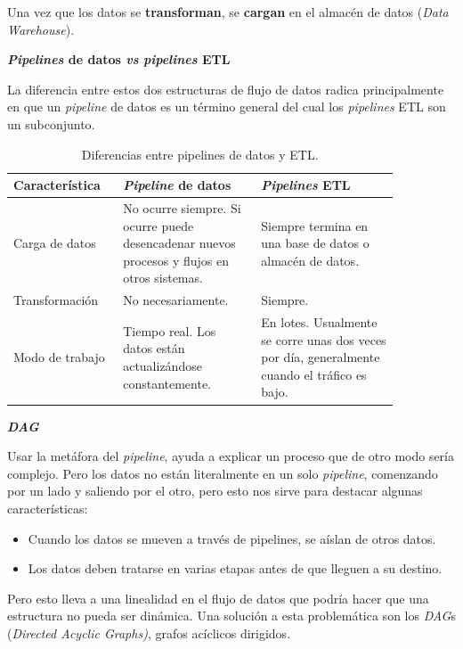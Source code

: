 \documentclass[a4paper,12pt]{article}
\begin{document}
		Una vez que los datos se \textbf{transforman}, se \textbf{cargan} en el almacén de datos (\textit{Data Warehouse}).
		
		\textbf{\textit{Pipelines} de datos \textit{vs} \textit{pipelines} ETL}
		
		La diferencia entre estos dos estructuras de flujo de datos radica principalmente en que un \textit{pipeline} de datos es un término general del cual los \textit{pipelines} ETL son un subconjunto. \citep{Tobin2020Jun}
		
		\begin{table}[H]
			\centering
			\begin{tabular}{p{0.22\linewidth}|p{0.32\linewidth}|p{0.32\linewidth}}
				\hline
				\textbf{Característica} & \textbf{\textit{Pipeline} de datos} & \textbf{\textit{Pipelines} ETL} \\ \hline
				Carga de datos &
				No ocurre siempre. Si ocurre puede desencadenar nuevos procesos y flujos en otros sistemas. &
				Siempre termina en una base de datos o almacén de datos. \\
				Transformación          & No necesariamente.                  & Siempre.                        \\
				Modo de trabajo &
				Tiempo real. Los datos están actualizándose constantemente. &
				En lotes. Usualmente se corre unas dos veces por día, generalmente cuando el tráfico es bajo. \\ \hline
			\end{tabular}
			\caption{Diferencias entre pipelines de datos y ETL.}
			\label{tab:pipelines-table}
		\end{table}
		
		\textbf{\textit{DAG}}
		
		Usar la metáfora del \textit{pipeline}, ayuda a explicar un proceso que de otro modo sería complejo. Pero los datos no están literalmente en un solo \textit{pipeline}, comenzando por un lado y saliendo por el otro, pero esto nos sirve para destacar algunas características: \citep{astronomer}
		\begin{itemize}[noitemsep, topsep=2pt]
			\item Cuando los datos se mueven a través de pipelines, se aíslan de otros datos.
			\item Los datos deben tratarse en varias etapas antes de que lleguen a su destino.
		\end{itemize}
		
		Pero esto lleva a una linealidad en el flujo de datos que podría hacer que una estructura no pueda ser dinámica. Una solución a esta problemática son los \textit{DAG}s (\textit{Directed Acyclic Graphs)}, grafos acíclicos dirigidos.
		
\end{document}
